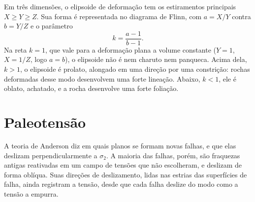 Em três dimensões, o elipsoide de deformação tem os estiramentos principais $X \ge Y
\ge Z$. Sua forma é representada no diagrama de Flinn, com $a = X/Y$ contra $b =
Y/Z$ e o parâmetro
\[
  k = \frac{a - 1}{b - 1} .
\]
Na reta $k = 1$, que vale para a deformação plana a volume constante ($Y = 1$,
$X = 1/Z$, logo $a = b$), o elipsoide não é nem charuto nem panqueca. Acima dela,
$k > 1$, o elipsoide é prolato, alongado em uma direção por uma constrição: rochas
deformadas desse modo desenvolvem uma forte lineação. Abaixo, $k < 1$, ele é oblato,
achatado, e a rocha desenvolve uma forte foliação.

\begin{omfigure}

\par{}\label{fig:b3:structural-analysis:flinn}
\end{omfigure}

\section{Paleotensão}\label{sec:b3:structural-analysis:palaeostress}

A teoria de Anderson diz em quais planos se formam novas falhas, e que elas deslizam
perpendicularmente a $\sigma_2$. A maioria das falhas, porém, são fraquezas antigas
reativadas em um campo de tensões que não escolheram, e deslizam de forma oblíqua.
Suas direções de deslizamento, lidas nas estrias das superfícies de falha,
ainda registram a tensão, desde que cada falha deslize do modo como a tensão
a empurra.

